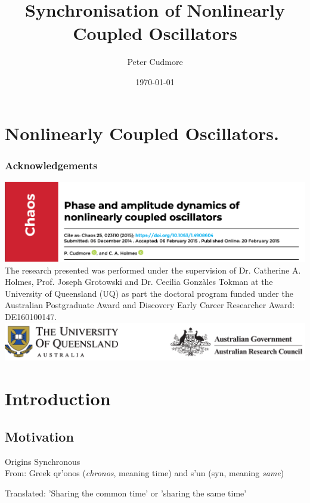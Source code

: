 \documentclass[10pt,reqno]{beamer}
\title{Synchronisation of Nonlinearly Coupled Oscillators}
\author{Peter Cudmore}
\institute{University of Melbourne}
\date{\today}
\newcommand{\textgreek}[1]{\begingroup\fontencoding{LGR}\selectfont#1\endgroup}
\begin{document}
\begin{frame}
\titlepage
\addtocounter{framenumber}{-1} 

\end{frame}
\section{Nonlinearly Coupled Oscillators.}

\begin{frame}
\frametitle{Acknowledgements}
\includegraphics[width=0.8\linewidth]{chaosss}
\vfill
{\scriptsize The research presented was performed under the supervision of Dr. Catherine A. Holmes, Prof. Joseph Grotowski and Dr. Cecilia Gonz\`ales Tokman at the University of Queensland (UQ) as part the doctoral program funded under the Australian Postgraduate Award and Discovery Early Career Researcher Award: DE160100147.}\\
\vfill
\includegraphics[width=\linewidth]{uqarc}	
\end{frame}
\section{Introduction}
\subsection{Motivation}
\begin{frame}{Origins}
Synchronous\cite{synch}\\

\vspace{5pt}
From: Greek \textgreek{qr'onos} (\emph{chronos}, meaning time) and \textgreek{s'un} (syn, meaning \emph{same})\\
\vspace{5pt}

Translated: 'Sharing the common time' or 'sharing the same time'
\end{frame}
\end{document}
